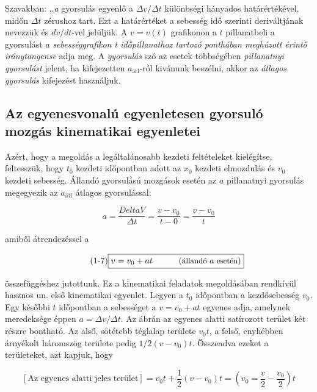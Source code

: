 \documentclass[../fizika.tex]{subfiles}
\begin{document}
                Szavakban: ,,\textit{a} gyorsulás egyenlő a $\Delta v / \Delta t$ különbségi hányados határértékével, midőn $\Delta t$ zérushoz tart. Ezt a határértéket a sebesség idő szerinti deriváltjának nevezzük és $dv/dt$-vel jelüljük. A $v = v(t)$ grafikonon a $t$ pillanatbeli a gyorsulást $a$ \textit{sebességgrafikon t időpillanathoz tartozó ponthában meghúzott érintő iránytangense} adja meg. A \textit{gyorsulás} szó az esetek többségében \textit{pillanatnyi gyorsulást} jelent, ha kifejezetten $a_{\text{átl}}$-ról kivánunk beszélni, akkor az \textit{átlagos gyorsulás} kifejezést használjuk.

            \subsection{Az egyenesvonalú egyenletesen gyorsuló mozgás kinematikai egyenletei}

                \noindent Azért, hogy a megoldás a legáltalánosabb kezdeti feltételeket kielégítse, feltesszük, hogy $t_0$ kezdeti időpontban adott az $x_0$ kezdeti elmozdulás és $v_0$ kezdeti sebesség. Állandó gyorsulású mozgások esetén az $a$ pillanatnyi gyorsulás megegyezik az $a_{\text{átl}}$ átlagos gyorsulással:

                \begin{equation*}
                    a = \frac{Delta V}{\Delta t} = \frac{v-v_0}{t-0} = \frac{v-v_0}{t}
                \end{equation*}

                \noindent amiből átrendezéssel a 

                \begin{equation} \tag{1-7} \label{eq:1-7}
                    \boxed{v= v_0 + at \;\;\;\;\;\;\;\;\;\;\; \small(\text{állandó }a\text{ esetén})}
                \end{equation}

                \noindent összefüggéshez jutottunk. Ez a kinematikai feladatok megoldásában rendkívül hasznos un. első kinematikai egyenlet. Legyen a $t_0$ időpontban a kezdősebesség $v_0$. Egy későbbi $t$ időpontban a sebességet a $v = v_0 + at$ egyenes adja, amelynek meredeksége éppen $a = \Delta v/\Delta t$. Az ábrán az egyenes alatti satírozott terület két részre bontható. Az alső, sötétebb téglalap területe $v_0t$, a felső, enyhébben árnyékolt háromszög területe pedig $1/2(v-v_0)t$. Összeadva ezeket a területeket, azt kapjuk, hogy 

                \begin{equation*}
                    \left[\text{Az egyenes alatti jeles terület}\right] = v_0t+\frac{1}{2}(v-v_0)t= \left(v_0=\frac{v}{2}-\frac{v_0}{2}\right)t
                \end{equation*}
\end{document}
